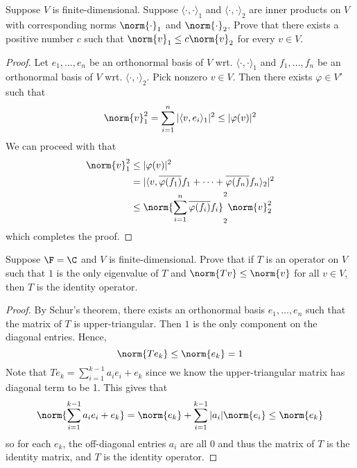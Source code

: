 \documentclass{extarticle}
\begin{document}
\begin{problem}{16}
    Suppose \(V\) is finite-dimensional. Suppose \(\langle \cdot,\cdot \rangle_1\) and
    \(\langle \cdot,\cdot \rangle_2\) are inner products on \(V\) with corresponding norms
    \(\norm{\cdot}_1\) and \(\norm{\cdot}_2\). Prove that there exists a positive number \(c\)
    such that \(\norm{v}_1 \leq c \norm{v}_2\) for every \(v \in V\).
\end{problem}

\begin{proof}
Let \(e_1, \ldots, e_n\) be an orthonormal basis of \(V\) wrt. \(\langle \cdot,\cdot \rangle_1\)
and \(f_1, \ldots, f_n\) be an orthonormal basis of \(V\) wrt. \(\langle \cdot,\cdot \rangle_2\). Pick
nonzero \( v \in V\). Then there exists \(\varphi \in V'\) such that
\[ \norm{v}_1^2 = \sum_{i=1}^{n} |\langle v,e_i \rangle_1|^2 \leq |\varphi(v)|^2\]
We can proceed with that
\begin{align*}
    \norm{v}_1^2
    &\leq |\varphi(v)|^2  \\
    &= | \langle v, \overline{\varphi(f_1)}f_1 + \cdots + \overline{\varphi(f_n)}f_n \rangle_2  |^2 \\
    &\leq  \norm{\sum_{i=1}^{n} \overline{\varphi(f_i)}f_i}_2^2  \norm{v}_2^2
\end{align*}
which completes the proof.
\end{proof}

\begin{problem}{17}
    Suppose \(\F = \C\) and \(V\) is finite-dimensional. Prove that if \(T\) is an operator on \(V\)
    such that \(1\) is the only eigenvalue of \(T\) and \(\norm{Tv} \leq \norm{v}\) for all \(v \in V\),
    then \(T\) is the identity operator.
\end{problem}

\begin{proof}
    By Schur's theorem, there exists an orthonormal basis \(e_1, \ldots, e_n\) such that the matrix of \(T\) is
    upper-triangular. Then \(1\) is the only component on the diagonal entries. Hence,
    \[\norm{T e_k} \leq \norm{e_k} = 1\]
    Note that \(Te_k = \sum_{i=1}^{k-1}a_i e_i + e_k\) since we know the upper-triangular matrix has diagonal term to be 1.
    This gives that
    \[\norm{\sum_{i=1}^{k-1} a_i e_i + e_k} = \norm{e_k} + \sum_{i=1}^{k-1}|a_i| \norm{e_i} \leq \norm{e_k}\]
    so for each \(e_k\), the off-diagonal entries \(a_i\) are all 0 and thus the matrix of \(T\) is the identity
    matrix, and \(T\) is the identity operator.
\end{proof}
\end{document}
